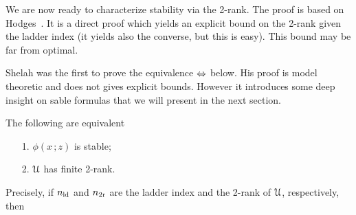\documentclass[scombinatorics.tex]{subfiles}
\begin{document}
We are now ready to characterize stability via the 2-rank.
The proof is based on Hodges~\cite{hodges}.
It is a direct proof which yields an explicit bound on the 2-rank given the ladder index (it yields also the converse, but this is easy).
This bound may be far from optimal.

Shelah was the first to prove the equivalence $\Leftrightarrow$ below.
His proof is model theoretic and does not gives explicit bounds.
However it introduces some deep insight on sable formulas that we will present in the next section.

\begin{theorem}\label{thm_hodges}
  The following are equivalent
  \begin{itemize}
    \item[1.] $\phi(x\,;z)$ is stable;
    \item[2.] $\EuScript U$ has finite 2-rank.
  \end{itemize}
  Precisely, if $n_{\rm ld}$ and $n_{\rm 2r}$ are the ladder index and the 2-rank of $\EuScript U$, respectively, then 
  

\end{theorem}
\end{document}
